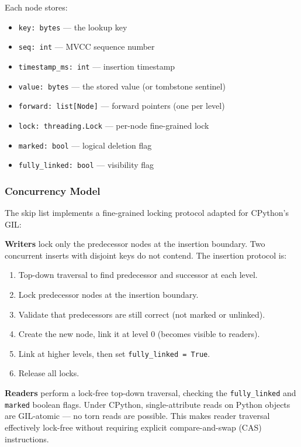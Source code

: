 \documentclass[conference]{IEEEtran}
\begin{document}
Each node stores:
\begin{itemize}[leftmargin=*]
    \item \texttt{key: bytes} --- the lookup key
    \item \texttt{seq: int} --- MVCC sequence number
    \item \texttt{timestamp\_ms: int} --- insertion timestamp
    \item \texttt{value: bytes} --- the stored value (or tombstone sentinel)
    \item \texttt{forward: list[Node]} --- forward pointers (one per level)
    \item \texttt{lock: threading.Lock} --- per-node fine-grained lock
    \item \texttt{marked: bool} --- logical deletion flag
    \item \texttt{fully\_linked: bool} --- visibility flag
\end{itemize}

\subsubsection{Concurrency Model}

The skip list implements a fine-grained locking protocol adapted for CPython's GIL:

\textbf{Writers} lock only the predecessor nodes at the insertion boundary. Two concurrent inserts with disjoint keys do not contend. The insertion protocol is:
\begin{enumerate}[leftmargin=*]
    \item Top-down traversal to find predecessor and successor at each level.
    \item Lock predecessor nodes at the insertion boundary.
    \item Validate that predecessors are still correct (not marked or unlinked).
    \item Create the new node, link it at level 0 (becomes visible to readers).
    \item Link at higher levels, then set \texttt{fully\_linked = True}.
    \item Release all locks.
\end{enumerate}

\textbf{Readers} perform a lock-free top-down traversal, checking the \texttt{fully\_linked} and \texttt{marked} boolean flags. Under CPython, single-attribute reads on Python objects are GIL-atomic --- no torn reads are possible. This makes reader traversal effectively lock-free without requiring explicit compare-and-swap (CAS) instructions.
\end{document}
